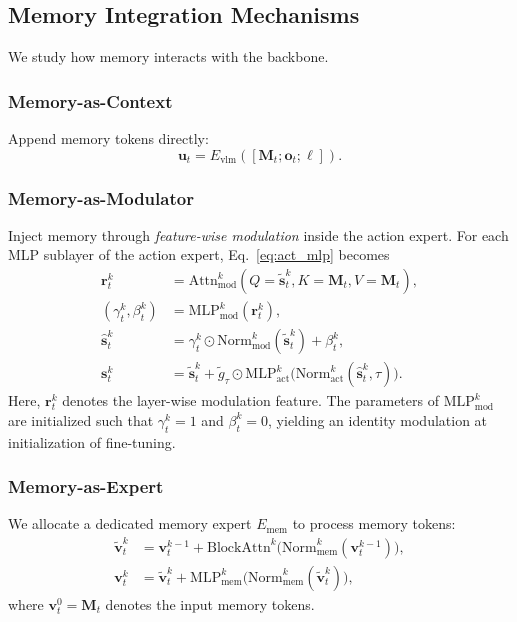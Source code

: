 \subsection{Memory Integration Mechanisms}
\label{sec:memory_integration}

We study how memory interacts with the backbone.

\subsubsection{Memory-as-Context}

Append memory tokens directly:
\[
\mathbf{u}_t
=
E_{\text{vlm}}([\mathbf{M}_t; \mathbf{o}_t;\boldsymbol{\ell}]).
\]

\subsubsection{Memory-as-Modulator}
Inject memory through \emph{feature-wise modulation} inside the action expert.
For each MLP sublayer of the action expert, Eq.~\ref{eq:act_mlp} becomes
\begin{align}
\mathbf{r}_t^{k}
&=\mathrm{Attn}^{k}_{\text{mod}}(Q=\tilde{\mathbf{s}}_t^{k}, K=\mathbf{M}_t, V=\mathbf{M}_t), \\
(\gamma_t^k,\beta_t^k)
&=
\mathrm{MLP}_{\text{mod}}^{k}(\mathbf{r}_t^{k}), \\
\widehat{\mathbf{s}}_t^{k}&=\gamma_t^k \odot
\mathrm{Norm}_{\text{mod}}^{k}(\tilde{\mathbf{s}}_t^{k})
+ \beta_t^k,\\
\mathbf{s}_t^{k}
&=
\tilde{\mathbf{s}}_t^{k}
+
\tilde{g}_{\tau} \odot
\mathrm{MLP}_{\text{act}}^{k}\!\Big(
\mathrm{Norm}_{\text{act}}^{k}(\widehat{\mathbf{s}}_t^{k}, \tau)\Big).
\end{align}
Here, $\mathbf{r}_t^{k}$ denotes the layer-wise modulation feature.
The parameters of $\mathrm{MLP}_{\text{mod}}^{k}$ are initialized such that
$\gamma_t^k=1$ and $\beta_t^k=0$, yielding an identity modulation at initialization of fine-tuning.

\subsubsection{Memory-as-Expert}

We allocate a dedicated memory expert $E_{\text{mem}}$ to process memory tokens:
\begin{align}
\tilde{\mathbf{v}}_t^{k}
&=
\mathbf{v}_t^{k-1}
+
\mathrm{BlockAttn}^{k}\!\big(
\mathrm{Norm}^{k}_{\text{mem}}(\mathbf{v}_t^{k-1})
\big), \\
\mathbf{v}_t^{k}
&=
\tilde{\mathbf{v}}_t^{k}
+
\mathrm{MLP}_{\text{mem}}^{k}\!\big(
\mathrm{Norm}^{k}_{\text{mem}}(\tilde{\mathbf{v}}_t^{k})
\big),
\end{align}
where $\mathbf{v}_t^{0}=\mathbf{M}_t$ denotes the input memory tokens.

